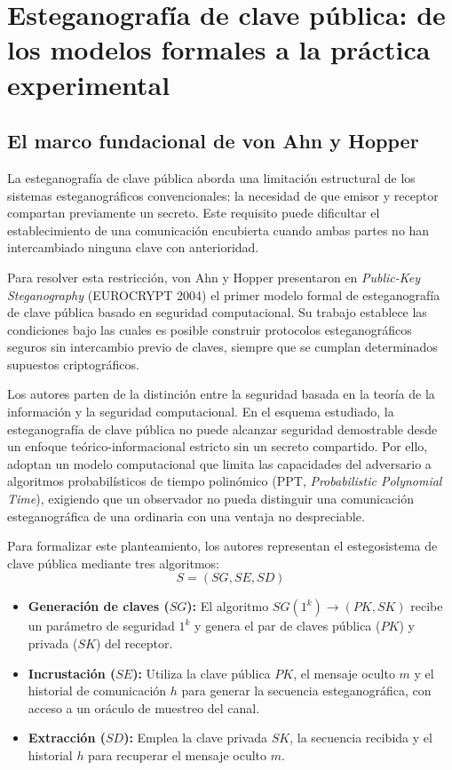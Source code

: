 \documentclass[IB]{TFUOC}%
\begin{document}
\section{Esteganografía de clave pública: de los modelos formales a la práctica experimental}
\label{sec:esteganografia_clave_publica}

\subsection{El marco fundacional de von Ahn y Hopper}

La esteganografía de clave pública aborda una limitación estructural de los sistemas esteganográficos convencionales: la necesidad de que emisor y receptor compartan previamente un secreto. Este requisito puede dificultar el establecimiento de una comunicación encubierta cuando ambas partes no han intercambiado ninguna clave con anterioridad.

Para resolver esta restricción, von Ahn y Hopper \cite{4} presentaron en \textit{Public-Key Steganography} (EUROCRYPT 2004) el primer modelo formal de esteganografía de clave pública basado en seguridad computacional. Su trabajo establece las condiciones bajo las cuales es posible construir protocolos esteganográficos seguros sin intercambio previo de claves, siempre que se cumplan determinados supuestos criptográficos.

Los autores parten de la distinción entre la seguridad basada en la teoría de la información y la seguridad computacional. En el esquema estudiado, la esteganografía de clave pública no puede alcanzar seguridad demostrable desde un enfoque teórico-informacional estricto sin un secreto compartido. Por ello, adoptan un modelo computacional que limita las capacidades del adversario a algoritmos probabilísticos de tiempo polinómico ($\mathrm{PPT}$, \textit{Probabilistic Polynomial Time}), exigiendo que un observador no pueda distinguir una comunicación esteganográfica de una ordinaria con una ventaja no despreciable.

Para formalizar este planteamiento, los autores representan el estegosistema de clave pública mediante tres algoritmos:
\begin{equation}
S = (SG, SE, SD)
\end{equation}

\begin{itemize}
    \item \textbf{Generación de claves ($SG$):} El algoritmo $SG(1^k) \rightarrow (PK, SK)$ recibe un parámetro de seguridad $1^k$ y genera el par de claves pública ($PK$) y privada ($SK$) del receptor.
    \item \textbf{Incrustación ($SE$):} Utiliza la clave pública $PK$, el mensaje oculto $m$ y el historial de comunicación $h$ para generar la secuencia esteganográfica, con acceso a un oráculo de muestreo del canal.
    \item \textbf{Extracción ($SD$):} Emplea la clave privada $SK$, la secuencia recibida y el historial $h$ para recuperar el mensaje oculto $m$.
\end{itemize}
\end{document}
